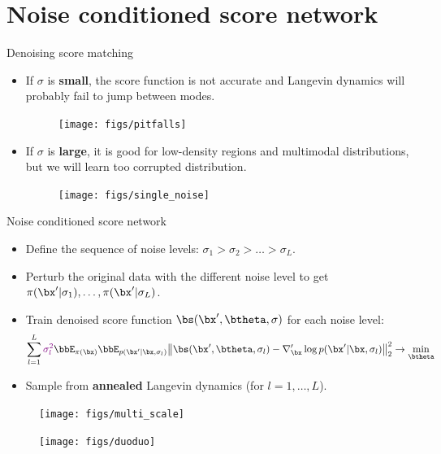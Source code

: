 \section{Noise conditioned score network}
\begin{frame}{Denoising score matching}
	\begin{itemize}
		\item If $\sigma$ is \textbf{small}, the score function is not accurate and Langevin dynamics will probably fail to jump between modes.
		\begin{figure}
			\texttt{[image: figs/pitfalls]}
		\end{figure}
		\item If $\sigma$ is \textbf{large}, it is good for low-density regions and  multimodal distributions, but we will learn too corrupted distribution.
		\begin{figure}
			\texttt{[image: figs/single\_noise]}
		\end{figure}
	\end{itemize}
\end{frame}
\begin{frame}{Noise conditioned score network}
	\begin{itemize}
		\item Define the sequence of noise levels: $\sigma_1 > \sigma_2 > \dots > \sigma_L$.
		\item Perturb the original data with the different noise level to get $\pi(\bx' | \sigma_1), \dots, \pi(\bx' | \sigma_L)$.
		\item Train denoised score function $\bs(\bx', \btheta, \sigma)$ for each noise level:
		\vspace{-0.2cm}
		\[
			\sum_{l=1}^L {\color{violet}\sigma_l^2} \bbE_{\pi(\bx)} \bbE_{p(\bx' | \bx, \sigma_l)}\bigl\| \bs(\bx', \btheta, \sigma_l) - \nabla_\bx' \log p(\bx' | \bx, \sigma_l) \bigr\|^2_2 \rightarrow \min_{\btheta}
		\]
		\item Sample from \textbf{annealed} Langevin dynamics (for $l=1, \dots, L$).
	\end{itemize}
	\begin{figure}
		\texttt{[image: figs/multi\_scale]}
	\end{figure}
	\begin{figure}
		\texttt{[image: figs/duoduo]}
	\end{figure}
\end{frame}
